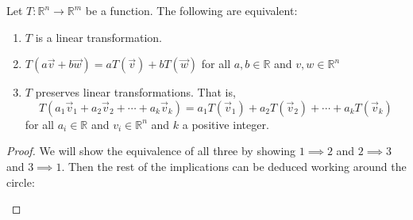 \begin{theorem}
Let $T:\mathbb{R}^n\to\mathbb{R}^m$ be a function. The following are equivalent:
\begin{enumerate}
\item $T$ is a linear transformation.
\item $T(a\vec{v}+b\vec{w})=aT(\vec{v})+bT(\vec{w})$ for all $a,b \in \mathbb{R}$ and $v,w \in \mathbb{R}^n$
\item $T$ preserves linear transformations. That is, 
\[T(a_1\vec{v}_1+a_2\vec{v}_2+\cdots+a_k\vec{v}_k)=
a_1T(\vec{v}_1)+a_2T(\vec{v}_2)+\cdots+a_kT(\vec{v}_k)\] 
for all $a_i \in \mathbb{R}$ and $v_i \in \mathbb{R}^n$ and $k$ a positive integer.
\end{enumerate}
\end{theorem}

\begin{proof}
We will show the equivalence of all three by showing $1 \implies 2$ and $2 
\implies 3$ and $3 \implies 1$. 
Then the rest of the implications can be deduced working around the circle:\\
\begin{center}
\end{center}

\end{proof}


